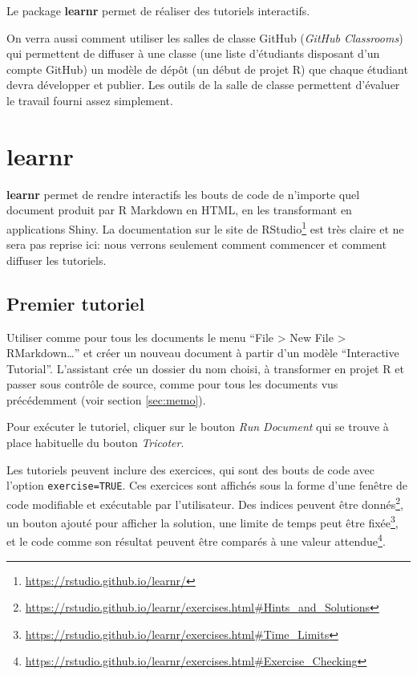 \documentclass[
  12pt,
  french,
  a4paper,
  extrafontsizes,onecolumn,openright
  ]{memoir}
\begin{document}
Le package \textbf{learnr} permet de réaliser des tutoriels interactifs.

On verra aussi comment utiliser les salles de classe GitHub (\emph{GitHub Classrooms}) qui permettent de diffuser à une classe (une liste d'étudiants disposant d'un compte GitHub) un modèle de dépôt (un début de projet R) que chaque étudiant devra développer et publier.
Les outils de la salle de classe permettent d'évaluer le travail fourni assez simplement.

\hypertarget{learnr}{%
\section{learnr}\label{learnr}}

\textbf{learnr} permet de rendre interactifs les bouts de code de n'importe quel document produit par R Markdown en HTML, en les transformant en applications Shiny.
La documentation sur le site de RStudio\footnote{\url{https://rstudio.github.io/learnr/}} est très claire et ne sera pas reprise ici: nous verrons seulement comment commencer et comment diffuser les tutoriels.

\hypertarget{premier-tutoriel}{%
\subsection{Premier tutoriel}\label{premier-tutoriel}}

Utiliser comme pour tous les documents le menu \enquote{File \textgreater{} New File \textgreater{} RMarkdown\ldots{}} et créer un nouveau document à partir d'un modèle \enquote{Interactive Tutorial}.
L'assistant crée un dossier du nom choisi, à transformer en projet R et passer sous contrôle de source, comme pour tous les documents vus précédemment (voir section \ref{sec:memo}).

Pour exécuter le tutoriel, cliquer sur le bouton \emph{Run Document} qui se trouve à place habituelle du bouton \emph{Tricoter}.

Les tutoriels peuvent inclure des exercices, qui sont des bouts de code avec l'option \texttt{exercise=TRUE}.
Ces exercices sont affichés sous la forme d'une fenêtre de code modifiable et exécutable par l'utilisateur.
Des indices peuvent être donnés\footnote{\url{https://rstudio.github.io/learnr/exercises.html\#Hints_and_Solutions}}, un bouton ajouté pour afficher la solution, une limite de temps peut être fixée\footnote{\url{https://rstudio.github.io/learnr/exercises.html\#Time_Limits}}, et le code comme son résultat peuvent être comparés à une valeur attendue\footnote{\url{https://rstudio.github.io/learnr/exercises.html\#Exercise_Checking}}.
\end{document}
